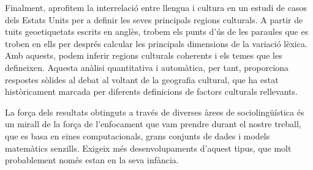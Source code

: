 \documentclass[../thesis.tex]{subfiles}
\begin{document}
\begin{otherlanguage}{catalan}
Finalment, aprofitem la interrelació entre llengua i cultura en un estudi de casos dels
Estats Units per a definir les seves principals regions culturals. A partir de tuits
geoetiquetats escrits en anglès, trobem els punts d'ús de les paraules que es troben en
ells per després calcular les principals dimensions de la variació lèxica. Amb aquests,
podem inferir regions culturals coherents i els temes que les defineixen. Aquesta
anàlisi quantitativa i automàtica, per tant, proporciona respostes sòlides al debat al
voltant de la geografia cultural, que ha estat històricament marcada per diferents
definicions de factors culturals rellevants.

La força dels resultats obtinguts a través de diverses àrees de sociolingüística és un
mirall de la força de l'enfocament que vam prendre durant el nostre treball, que es basa
en eines computacionals, grans conjunts de dades i models matemàtics senzills. Exigeix
més desenvolupaments d'aquest tipus, que molt probablement només estan en la seva
infància.
\end{otherlanguage}

\endgroup

\vfill
\end{document}
